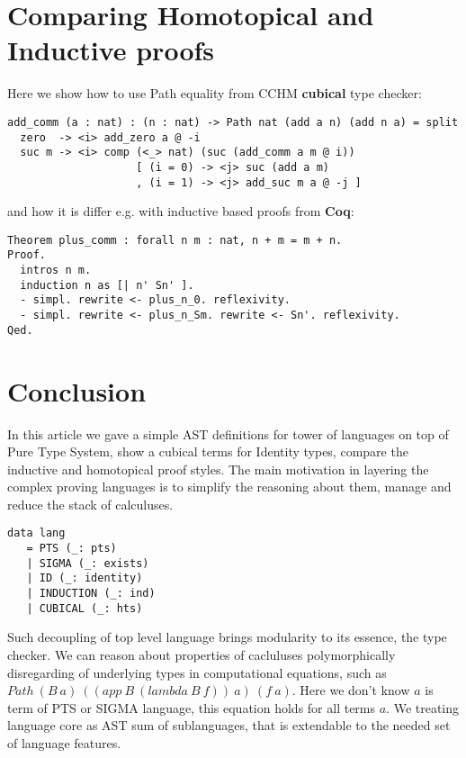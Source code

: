 \documentclass{article}
\begin{document}
\section{Comparing Homotopical and Inductive proofs}

Here we show how to use Path equality from CCHM {\bf cubical} type checker:

\begin{lstlisting}[mathescape=true]
add_comm (a : nat) : (n : nat) -> Path nat (add a n) (add n a) = split
  zero  -> <i> add_zero a @ -i
  suc m -> <i> comp (<_> nat) (suc (add_comm a m @ i))
                    [ (i = 0) -> <j> suc (add a m)
                    , (i = 1) -> <j> add_suc m a @ -j ]
\end{lstlisting}

and how it is differ e.g. with inductive based proofs from {\bf Coq}:

\begin{lstlisting}[mathescape=true]
Theorem plus_comm : forall n m : nat, n + m = m + n.
Proof.
  intros n m.
  induction n as [| n' Sn' ].
  - simpl. rewrite <- plus_n_0. reflexivity.
  - simpl. rewrite <- plus_n_Sm. rewrite <- Sn'. reflexivity.
Qed.
\end{lstlisting}

\section{Conclusion}
In this article we gave a simple AST definitions for tower of languages
on top of Pure Type System, show a cubical terms for Identity types, compare
the inductive and homotopical proof styles. The main motivation in
layering the complex proving languages is to simplify the reasoning about them,
manage and reduce the stack of calculuses.

\begin{lstlisting}[mathescape=true]
data lang
   = PTS (_: pts)
   | SIGMA (_: exists)
   | ID (_: identity)
   | INDUCTION (_: ind)
   | CUBICAL (_: hts)
\end{lstlisting}

Such decoupling of top level language brings modularity to its essence,
the type checker. We can reason about properties of cacluluses polymorphically
disregarding of underlying types in computational equations, such as
$Path\ (B\ a)\ ((app\ B\ (lambda\ B\ f))\ a)\ (f\ a)$. Here we don't know $a$ is
term of PTS or SIGMA language, this equation holds for all terms $a$.
We treating language core as AST sum of sublanguages, that is
extendable to the needed set of language features.



\end{document}
